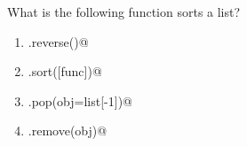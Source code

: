 \question
What is the following function sorts a list?

\begin{enumerate}
\item \lstinline@list.reverse()@
\item \lstinline@list.sort([func])@
\item \lstinline@list.pop(obj=list[-1])@
\item \lstinline@list.remove(obj)@
\end{enumerate}

